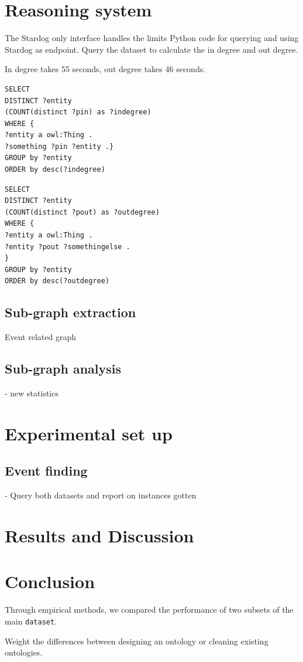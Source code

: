 \documentclass[runningheads,a4paper]{../../StyleFiles/llncs}
\begin{document}
\section{Reasoning system}
The Stardog only interface handles the limits 
Python code for querying and using Stardog as endpoint. 
Query the dataset to calculate the in degree and out degree.

In degree takes 55 seconds, out degree takes 46 seconds.
 
\begin{lstlisting}[captionpos=b, caption=SPARQL query for calculating in degree of entities, label=lst:sparql, basicstyle=\ttfamily\small,frame=bt]
SELECT
DISTINCT ?entity
(COUNT(distinct ?pin) as ?indegree)
WHERE { 
?entity a owl:Thing .
?something ?pin ?entity .}
GROUP by ?entity
ORDER by desc(?indegree)
\end{lstlisting}

\begin{lstlisting}[captionpos=b, caption=SPARQL query for calculating out degree of entities, label=lst:sparql, basicstyle=\ttfamily\small,frame=bt]
SELECT
DISTINCT ?entity
(COUNT(distinct ?pout) as ?outdegree)
WHERE { 
?entity a owl:Thing .
?entity ?pout ?somethingelse .
}
GROUP by ?entity
ORDER by desc(?outdegree)
\end{lstlisting}

\subsection{Sub-graph extraction}
Event related graph

\subsection{Sub-graph analysis}
- new statistics

\section{Experimental set up}

\subsection{Event finding}
- Query both datasets and report on instances gotten

\section{Results and Discussion}

\section{Conclusion}
Through empirical methods, we compared the performance of two subsets of the main \texttt{dataset}. 

Weight the differences between designing an ontology or cleaning existing ontologies.



\end{document}
